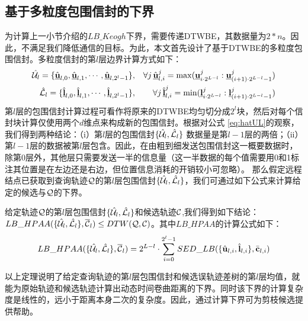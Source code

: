 \subsection{基于多粒度包围信封的下界} 
为计算上一小节介绍的$LB\_Keogh$下界，需要传递DTWBE，其数据量为$2*n$。因此，不满足我们降低通信的目标。为此，本文首先设计了基于DTWBE的多粒度包围信封。多粒度信封的第$l$层边界计算方式如下：
\begin{eqnarray}\label{eq:hatUL}
\hat{{\cal U}}_l =\{ \hat{\emph{{\textbf{u}}}}_{l,0}, \hat{\emph{{\textbf{u}}}}_{l,1},\cdots, \hat{\emph{{\textbf{u}}}}_{l,2^l-1}\}  &,&
\forall j  \, \hat{\emph{{\textbf{u}}}}_{l,i}^{j}=\max(\emph{{\textbf{u}}}_{i\cdot 2^{L-l}}^{j} : \emph{{\textbf{u}}}_{(i+1)\cdot 2^{L-l}-1}^{j})  \nonumber \\
\hat{{\cal L}}_l=\{\hat{\emph{{\textbf{l}}}}_{l,0}, \hat{\emph{{\textbf{l}}}}_{l,1},\cdots, \hat{\emph{{\textbf{l}}}}_{l,2^l-1}\}   &,&
\forall j  \, \hat{\emph{{\textbf{l}}}}_{l,i}^{j}=\min(\emph{{\textbf{l}}}_{i\cdot 2^{L-l}}^{j} : \emph{{\textbf{l}}}_{(i+1)\cdot 2^{L-l}-1}^{j})
\end{eqnarray}	
第$l$层的包围信封计算过程可看作将原来的DTWBE均匀切分成$2^l$块，然后对每个信封块计算仅使用两个$d$维点来构成新的包围信封。根据对公式 \ref{eq:hatUL}的观察，我们得到两种结论：（i）第$l$层的包围信封$\{\hat{{\cal U}}_{l}, \hat{{\cal L}}_{l}\}$ 数据量是第$l-1$层的两倍；（ii）第$l-1$层的数据被第$l$层包含。因此，在由粗到细发送包围信封这一概要数据时，除第$0$层外，其他层只需要发送一半的信息量（这一半数据的每个值需要用0和1标注其位置是在左边还是右边，但位置信息消耗的开销较小可忽略）。
那么假定远程结点已获取到查询轨迹$\cal Q$的第$l$层包围信封$\{\hat{{\cal U}}_l,\hat{{\cal L}}_l\}$，我们可通过如下公式来计算给定的候选与$\cal Q$的下界。
\begin{theorem}\label{theo:HPAA}
	给定轨迹$\cal Q$的第$l$层包围信封$\{\hat{{\cal U}}_{l}, \hat{{\cal L}}_{l}\}$和候选轨迹$\cal C$,我们得到如下结论：
	 $LB\_HPAA({  \{\hat{{\cal U}_{l}}, \hat{{\cal L}_{l}}\},\overline{{\cal C}}_{l}}) \le DTW(\cal Q, \cal C)$。其中$LB\_HPAA$的计算公式如下：
	 \begin{eqnarray}\label{bound:HPAA}
	 LB\_HPAA({\{\hat{{\cal U}_{l}}, \hat{{\cal L}_{l}}\},\overline{{\cal C}}_{l}})= 2^{L-l} \cdot \sum_{i=0}^{2^{l}-1} SED\_LB(\{ \hat{\textbf{u}}_{l,i}, \hat{\textbf{l}}_{l,i} \}, \bar{\textbf{c}}_{l,i})\nonumber
	 \end{eqnarray}
\end{theorem}
以上定理说明了给定查询轨迹的第$l$层包围信封和候选误轨迹差树的第$l$层均值，就能为原始轨迹和候选轨迹计算出动态时间卷曲距离的下界。同时该下界的计算复杂度是线性的，远小于距离本身二次的复杂度。因此，通过计算下界可为剪枝候选提供帮助。

